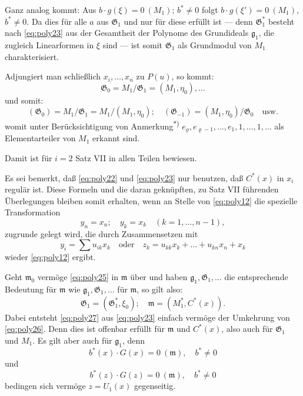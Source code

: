 \documentclass[fontsize=10pt,paper=a5,pagesize,headings=small]{scrbook}
\newcommand{\ideal}[1]{\mathfrak{#1}}
\theoremstyle{plain}
\begin{document}
Ganz analog kommt: Aus $b \cdot g(\xi) = 0\ (M_1)$; $b^* \neq 0$ folgt
$b \cdot g(\xi') = 0\ (M_1)$, $b^* \neq 0$. Da dies für alle $a$ aus $\mathfrak{G}_1$ und nur für diese
erfüllt ist --- denn $\mathfrak{G}_1^*$ besteht nach \eqref{eq:poly23} aus der Gesamtheit der Polynome
des Grundideals $\ideal{g}_1$, die zugleich Linearformen in $\xi$ sind --- ist somit $\mathfrak{G}_1$ als Grundmodul
von $M_1$ charakterisiert.

Adjungiert man schließlich $x_i,\dots,x_n$ zu $P(u)$, so kommt:
\begin{equation}
\label{eq:poly24}
\mathfrak{G}_0 = M_1/\mathfrak{G}_1 = (M_1, \eta_0),\dots
\end{equation}
und somit:
\[ (\mathfrak{G}_0) = M_1/\mathfrak{G}_1 = M_1/(M_1,\eta_0);\quad (\mathfrak{G}_{-1}) = (M_1,\eta_0)/\mathfrak{G}_0 \quad \text{usw.} \]
womit unter Berücksichtigung von Anmerkung\textsuperscript{$*$)} $e_\varrho, e_{\varrho-1},\dots,e_1,1,\dots,1,\dots$
als Elementarteiler von $M_1$ erkannt sind.

Damit ist für $i=2$ Satz VII in allen Teilen bewiesen.

Es sei bemerkt, daß \eqref{eq:poly22} und \eqref{eq:poly23} nur benutzen, daß $C^*(x)$
in $x_i$ regulär ist. Diese Formeln und die daran geknüpften, zu Satz VII führenden
Überlegungen bleiben somit erhalten, wenn an Stelle von \eqref{eq:poly12} die spezielle
Transformation
\begin{equation}
\label{eq:poly25}
y_n = x_n;\quad y_k = x_k \quad (k=1,\dots,n-1),
\end{equation}
zugrunde gelegt wird, die durch Zusammensetzen mit
\begin{equation}
\label{eq:poly26}
y_i = \sum u_{ik} x_k \quad \text{oder}\quad z_k = u_{kk} x_k + \dots + u_{kn} x_n + x_k
\end{equation}
wieder \eqref{eq:poly12} ergibt.

\newpage
\setcounter{page}{436}

Geht $\ideal{m}_0$ vermöge \eqref{eq:poly25} in $\ideal{m}$ über und haben $\ideal{g}_1, \mathfrak{G}_1,\dots$ die entsprechende
Bedeutung für $\ideal{m}$ wie $\ideal{g}_1, \mathfrak{G}_1,\dots$ für $\ideal{m}$, so gilt also:
\begin{equation}
\label{eq:poly27}
\mathfrak{G}_1 = (\mathfrak{G}_1^*, \xi_0);\quad \ideal{m} = (M_1^*, C^*(x)).
\end{equation}
Dabei entsteht \eqref{eq:poly27} aus \eqref{eq:poly23} einfach vermöge der Umkehrung von
\eqref{eq:poly26}. Denn dies ist offenbar erfüllt für $\ideal{m}$ und $C^*(x)$, also auch für
$\mathfrak{G}_1$ und $M_1$. Es gilt aber auch für $\ideal{g}_1$, denn
\[ b^*(x) \cdot G(x) = 0\ (\ideal{m}),\quad b^* \neq 0 \]
und
\[ b^*(z) \cdot G(z) = 0\ (\ideal{m}),\quad b^* \neq 0 \]
bedingen sich vermöge $z = U_1(x)$ gegenseitig.
\end{document}
